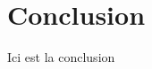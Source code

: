 \documentclass{article}
\begin{document}
\section{Conclusion}

Ici est la conclusion






\end{document}
